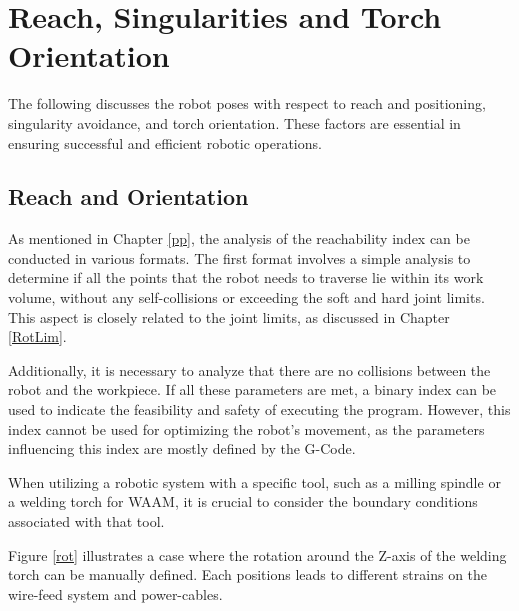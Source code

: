 \newpage
\section{Reach, Singularities and Torch Orientation}
The following discusses the robot poses with respect to reach and positioning, singularity avoidance, and torch orientation. These factors are essential in ensuring successful and efficient robotic operations.

\subsection{Reach and Orientation}\label{RO}

As mentioned in Chapter \ref{pp}, the analysis of the reachability index can be conducted in various formats. The first format involves a simple analysis to determine if all the points that the robot needs to traverse lie within its work volume, without any self-collisions or exceeding the soft and hard joint limits. This aspect is closely related to the joint limits, as discussed in Chapter \ref{RotLim}. 

Additionally, it is necessary to analyze that there are no collisions between the robot and the workpiece. If all these parameters are met, a binary index can be used to indicate the feasibility and safety of executing the program. However, this index cannot be used for optimizing the robot's movement, as the parameters influencing this index are mostly defined by the G-Code.

When utilizing a robotic system with a specific tool, such as a milling spindle or a welding torch for \acrshort{WAAM}, it is crucial to consider the boundary conditions associated with that tool. 




Figure \ref{rot} illustrates a case where the rotation around the Z-axis of the welding torch can be manually defined. Each positions leads to different strains on the wire-feed system and power-cables.

